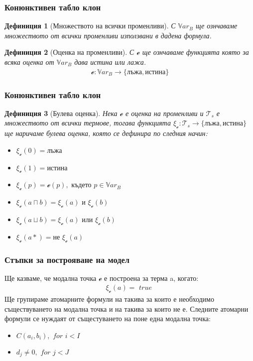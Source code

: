 \documentclass{beamer}
\newtheorem{defn}{Дефиниция}[section]
\newcommand{\curvedE}{\mathscr{e}}
\newcommand{\Var}{\mathbb{V}ar}
\newcommand{\vBool}{\xi}
\newcommand{\Ts}{\mathcal{T}_s}
\begin{document}
\begin{frame}\frametitle{Конюнктивен табло клон}
\begin{defn}[Множеството на всички променливи]
	С $\Var_B$ ще ознчаваме множеството от всички променливи използвани в дадена формула.
\end{defn}

\begin{defn}[Оценка на променливи]
	С $\curvedE$ ще ознчаваме функцията която за всяка оценка от $\Var_B$ дава истина или лажа.
		\begin{align*}
			\curvedE : \Var_B \rightarrow \{ \textbf{лъжа}, \textbf{истина}\}
		\end{align*}
\end{defn}
\end{frame}

\begin{frame}\frametitle{Конюнктивен табло клон}
\begin{defn}[Булева оценка]
		Нека $\curvedE$ е оценка на променливи и $\Ts$ е множеството от всички термове, тогава 
		функцията $\vBool_{\curvedE} : \Ts \rightarrow \{ \textbf{лъжа}, \textbf{истина}\}$ ще наричаме булева оценка, която се дефинира по следния начин:
		\begin{itemize}
			\item $\vBool_{\curvedE}(0) = \textbf{лъжа}$
			\item $\vBool_{\curvedE}(1) = \textbf{истина}$
			\item $\vBool_{\curvedE}(p) = \curvedE(p), \textit{ където } p \in \Var_B$
			\item $\vBool_{\curvedE}(a \sqcap b) = \vBool_{\curvedE}(a) \textit{ и } \vBool_{\curvedE}(b)$
			\item $\vBool_{\curvedE}(a \sqcup b) = \vBool_{\curvedE}(a) \textit{ или } \vBool_{\curvedE}(b)$
			\item $\vBool_{\curvedE}(a*) = \textit{не } \vBool_{\curvedE}(a)$
		\end{itemize}
\end{defn}
\end{frame}

\begin{frame}\frametitle{Стъпки за построяване на модел}
	Ще казваме, че модална точка $\curvedE$ е построена за терма a, когато:
		\begin{align*}
			\vBool_{\curvedE}(a) = \textit{ true }
		\end{align*}
	Ще групираме атомарните формули на такива за които е необходимо съществуването на модална точка и на такива за които не е.
\newline
	Следните атомарни формули се нуждаят от същестуването на поне една модална точка:
		\begin{itemize}
			\item $C(a_i, b_i), \textit{ for } i < I$
			\item $d_j \neq 0, \textit{ for } j < J$
		\end{itemize}
\end{frame}
\end{document}
